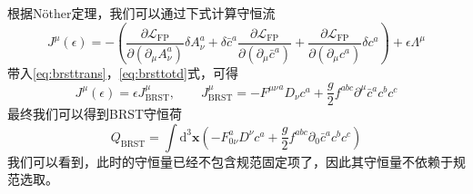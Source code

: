 根据Nöther定理，我们可以通过下式计算守恒流
\begin{equation}
    J^\mu(\epsilon) = -\left( \frac{\partial \mathscr{L}_\text{FP}}{\partial(\partial_\mu A_\nu^a)}\delta A^a_\nu +\delta\bar{c}^a \frac{\partial \mathscr{L}_\text{FP}}{\partial(\partial_\mu\bar{c}^a)} + \frac{\partial \mathscr{L}_\text{FP}}{\partial (\partial_\mu c^a)}\delta c^a \right) + \epsilon \Lambda^\mu
\end{equation}
带入\eqref{eq:brsttrans}，\eqref{eq:brsttotd}式，可得
\begin{equation}
    J^\mu(\epsilon) =\epsilon J^\mu_\text{BRST} , \qquad J^\mu_\text{BRST} =  -{F^{\mu\nu}}^aD_\nu c^a + \frac{g}{2}f^{abc}\partial^\mu \bar{c}^a c^b c^c 
\end{equation}
最终我们可以得到BRST守恒荷
\begin{equation}
    Q_\text{BRST} = \int \mathrm{d}^3\boldsymbol{x} \left( -F^a_{0\nu}D^\nu c^a + \frac{g}{2}f^{abc} \partial_0 \bar{c}^a c^b c^c\right)\label{eq:QBRST}
    \end{equation}
我们可以看到，此时的守恒量已经不包含规范固定项了，因此其守恒量不依赖于规范选取。

